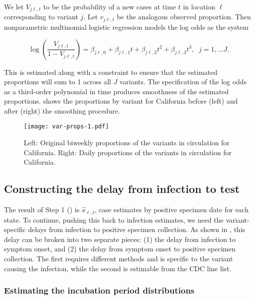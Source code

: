 We let $V_{j\ell,t}$ to be the probability of a new cases at time $t$ in location
$\ell$ corresponding to variant $j$. Let $v_{j\ell,t}$ be the analogous observed
proportion. Then nonparametric multinomial logistic regression models the log odds
as the system
\begin{linenomath*}
\begin{equation}
\log\left(\frac{V_{j\ell,t}}{1-V_{j\ell,t}}\right) = \beta_{j\ell,0} + \beta_{j\ell,1} t + \beta_{j\ell,2}t^2 + \beta_{j\ell,3}t^3,\;\; j=1,\ldots J.
\end{equation}
\end{linenomath*}
This is estimated along with a constraint to ensure that the estimated proportions will sum to 1 across all
$J$ variants. The specification of the log odds as a third-order polynomial in
time produces smoothness of the estimated proportions.
  shows the proportions by variant for California before
(left) and after (right) the smoothing procedure. 

\begin{figure}[!tb]
    \centering
        \texttt{[image: var-props-1.pdf]}
        \caption{Left: Original biweekly proportions of the variants in circulation
        for California. Right: Daily proportions of the variants in circulation for
        California.}
        \label{fig:prop_figs}
    \end{figure}


    


\subsection{Constructing the delay from infection to test}
\label{supp:delay-sops}

The result of Step 1 () is $\widehat{x}_{\ell,t}$, case
estimates by positive specimen date for each state. To continue, pushing this
back to infection estimates, we need the variant-specific delays from infection
to positive specimen collection. As shown in , this delay can be broken into two separate pieces: (1) the
delay from infection to symptom onset, and (2) the delay from symptom onset to
positive specimen collection. The first requires different methods and is
specific to the variant causing the infection, while the second is estimable from the CDC line
list.

\subsubsection{Estimating the incubation period distributions} 
\label{sec:incubation}

